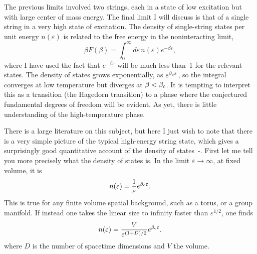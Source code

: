 The previous limits involved two strings, each in a state of
low excitation but with large center of mass energy.  The final
limit I will discuss is that of a single string in a very high state
of excitation.  The density of single-string states per unit energy
$n(\varepsilon)$ is related to the free energy in the noninteracting
limit,
\begin{equation}
\beta F(\beta) = \int_0^\infty d\varepsilon\,n(\varepsilon)
e^{-\beta\varepsilon},  \label{freeen}
\end{equation}
where I have used the fact that $e^{-\beta\varepsilon}$ will be much
less than~1 for the relevant states.
The density of states grows exponentially, as $e^{\beta_{\rm c}
\varepsilon}$, so the integral converges at low temperature but
diverges at $\beta < \beta_{\rm c}$.
It is tempting to interpret this as a transition
(the Hagedorn transition) to a phase where the conjectured 
fundamental degrees of freedom will be evident.  As yet, there
is little understanding of the high-temperature phase.

There is a large literature on this subject, but
here I just wish to note that there is a very simple picture of the
typical high-energy string state, which gives a surprisingly good
quantitative account of the density of
states~\cite{SSk}-\cite{LoTh}. First let me 
tell you more precisely what the density of states is.  In the limit
$\varepsilon \to \infty$, at fixed volume,
it is
\begin{equation}
n(\varepsilon) = \frac{1}{\varepsilon} e^{\beta_{\rm c}\varepsilon}.
\label{den1}
\end{equation}
This is true for any finite volume spatial background, such as a
torus, or a group manifold.  If instead one takes the linear size to
infinity faster than $\varepsilon^{1/2}$, one finds
\begin{equation}
n(\varepsilon) = \frac{V}{\varepsilon^{(1 + D)/2}}
e^{\beta_{\rm c}\varepsilon}.
\label{den2}
\end{equation}
where $D$ is the number of spacetime dimensions and $V$ the volume. 


